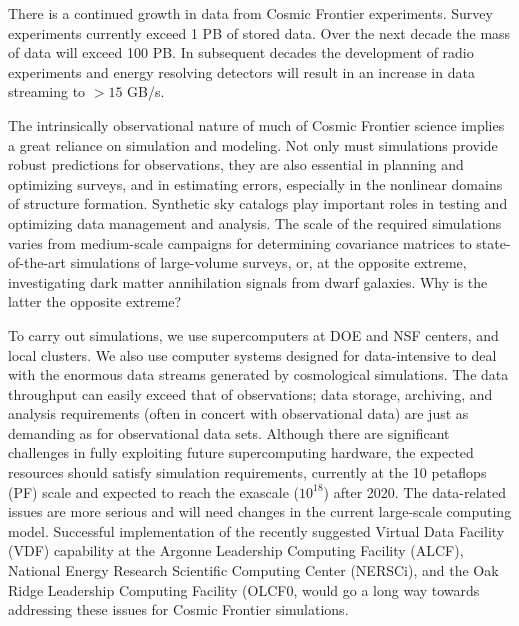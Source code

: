 There is a continued growth in data from Cosmic Frontier
experiments. 
Survey experiments currently exceed 1 PB of stored
data. Over the next decade the mass of data will exceed 100 PB. In
subsequent decades the development of radio experiments and energy
resolving detectors will result in an increase in data streaming to
$> 15$ GB/s.

The intrinsically observational nature of much of Cosmic Frontier
science implies a great reliance on simulation and modeling. Not only
must simulations provide robust predictions for observations, they are
also essential in planning and optimizing surveys, and in estimating
errors, especially in the nonlinear domains of structure
formation. Synthetic sky catalogs play important roles in testing and
optimizing data management and analysis. The scale of the
required simulations varies from medium-scale campaigns for
determining covariance matrices to state-of-the-art simulations of
large-volume surveys, or, at the opposite extreme,
investigating dark matter annihilation signals from dwarf galaxies.
{\red Why is the latter the opposite extreme?}

To carry out simulations, we use supercomputers at DOE and NSF centers,
and local clusters.  We also use computer systems designed for
data-intensive to deal with
the enormous data streams generated by cosmological simulations. 
The
data throughput can easily exceed that of observations; data storage,
archiving, and analysis requirements (often in concert with
observational data) are just as demanding as for observational
data sets. Although there are significant challenges in fully
exploiting future supercomputing hardware, the expected resources
should satisfy simulation requirements, currently at the 10 
petaflops (PF)
scale and expected to reach the exascale ($10^18$) after 2020. The data-related
issues are more serious and will need changes in the current
large-scale computing model. Successful implementation of the recently
suggested Virtual Data Facility (VDF) capability at 
the Argonne Leadership Computing Facility (ALCF), 
National Energy Research Scientific Computing Center (NERSCi), and
the Oak Ridge Leadership Computing Facility (OLCF0, 
would go a long way towards addressing these issues for Cosmic Frontier 
simulations.

